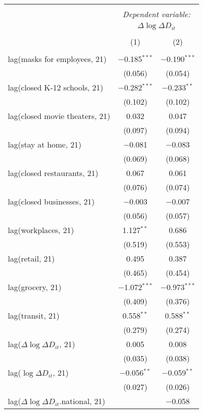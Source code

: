 \begin{tabular}{@{\extracolsep{1pt}}lcc} 
\\[-1.8ex]\hline 
\hline \\[-1.8ex] 
 & \multicolumn{2}{c}{\textit{Dependent variable:}} \\ 
\cline{2-3} 
 & \multicolumn{2}{c}{$\Delta \log \Delta D_{it}$} \\ 
\\[-1.8ex] & (1) & (2)\\ 
\hline \\[-1.8ex] 
 lag(masks for employees, 21) & $-$0.185$^{***}$ & $-$0.190$^{***}$ \\ 
  & (0.056) & (0.054) \\ 
  lag(closed K-12 schools, 21) & $-$0.282$^{***}$ & $-$0.233$^{**}$ \\ 
  & (0.102) & (0.102) \\ 
  lag(closed movie theaters, 21) & 0.032 & 0.047 \\ 
  & (0.097) & (0.094) \\ 
  lag(stay at home, 21) & $-$0.081 & $-$0.083 \\ 
  & (0.069) & (0.068) \\ 
  lag(closed restaurants, 21) & 0.067 & 0.061 \\ 
  & (0.076) & (0.074) \\ 
  lag(closed businesses, 21) & $-$0.003 & $-$0.007 \\ 
  & (0.056) & (0.057) \\ 
  lag(workplaces, 21) & 1.127$^{**}$ & 0.686 \\ 
  & (0.519) & (0.553) \\ 
  lag(retail, 21) & 0.495 & 0.387 \\ 
  & (0.465) & (0.454) \\ 
  lag(grocery, 21) & $-$1.072$^{***}$ & $-$0.973$^{***}$ \\ 
  & (0.409) & (0.376) \\ 
  lag(transit, 21) & 0.558$^{**}$ & 0.588$^{**}$ \\ 
  & (0.279) & (0.274) \\ 
  lag($\Delta \log \Delta D_{it}$, 21) & 0.005 & 0.008 \\ 
  & (0.035) & (0.038) \\ 
  lag($\log \Delta D_{it}$, 21) & $-$0.056$^{**}$ & $-$0.059$^{**}$ \\ 
  & (0.027) & (0.026) \\ 
  lag($\Delta \log \Delta D_{it}$.national, 21) &  & $-$0.058 \\ 

\end{tabular}
